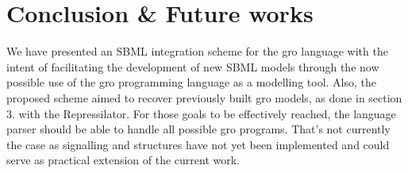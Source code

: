 \documentclass[12pt]{article}
\begin{document}
\section{Conclusion \& Future works}
    
    
    We have presented an SBML integration scheme for the gro language with the intent of facilitating the development of new SBML models through the now possible use of the gro programming language as a modelling tool. Also, the proposed scheme aimed to recover previously built gro models, as done in section 3. with the Repressilator. For those goals to be effectively reached, the language parser should be able to handle all possible gro programs. That's not currently the case as signalling and structures have not yet been implemented and could serve as practical extension of the current work.




\end{document}
